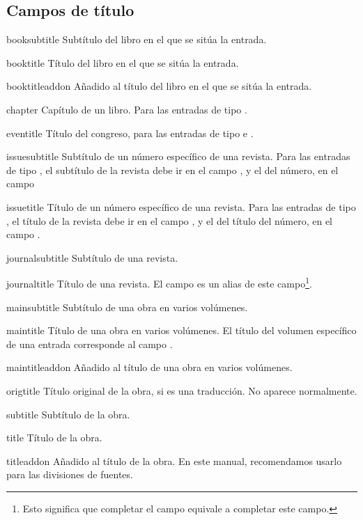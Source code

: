 \subsection{Campos de título}


\begin{choix}
	\item[booksubtitle]Subtítulo del libro en el que se sitúa la entrada. 
   	\item[booktitle] Título del libro en el que se sitúa la entrada. 		
   	\item[booktitleaddon] Añadido al título del libro en el que se
          sitúa la entrada. 
   	\item[chapter] Capítulo de un libro. Para las entradas de tipo .	
   	\item[eventitle] Título del congreso, para las entradas de
          tipo  e .
   	\item[issuesubtitle] Subtítulo de un número específico de una
          revista.  Para las entradas de tipo , el
          subtítulo de la revista debe ir en el campo
          , y el del número, en el campo 		
   	\item[issuetitle] Título de un número específico de una
          revista. Para las entradas de tipo , el
          título de la revista debe ir en el campo , y el
          del título del número, en el campo .		
   	\item[journalsubtitle] Subtítulo de una revista.							
   	\item[journaltitle] Título de una revista. El campo
           es un alias de este campo\footnote{Esto
            significa que completar el campo  equivale
            a completar este campo.}.
   	\item[mainsubtitle] Subtítulo de una obra en varios volúmenes.			
   	\item[maintitle] Título de una obra en varios volúmenes. El
          título del volumen específico de una entrada corresponde al campo .						
   	\item[maintitleaddon]  Añadido al título de una obra en varios
          volúmenes.		
   	\item[origtitle] Título original de la obra, si es una
          traducción. No aparece normalmente. 	
   	\item[subtitle] Subtítulo de la obra.									
   	\item[title] Título de la obra.									
   	\item[titleaddon] Añadido al título de la obra. En este
          manual, recomendamos usarlo para las divisiones de
          fuentes.
\end{choix}

